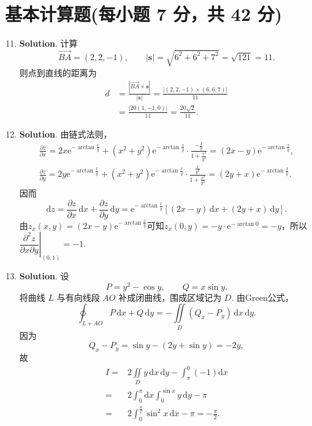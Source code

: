 \documentclass[../main.tex]{subfiles}
\begin{document}
\section{基本计算题(每小题 7 分，共 42 分)}
\begin{enumerate}
    \setcounter{enumi}{10}
    \item \textbf{Solution}. 计算
          \[
              \overrightarrow{BA}=(2,2,-1),\qquad |\boldsymbol{s}|=\sqrt{6^2+6^2+7^2}=\sqrt{121}=11.
          \]
          则点到直线的距离为
          \[
              \begin{aligned}
                  d & =\frac{|\overrightarrow{BA}\times \boldsymbol{s}|}{|\boldsymbol{s}|}
                  =\frac{|(2,2,-1)\times (6,6,7)|}{11}                                     \\
                    & =\frac{|20(1,-1,0)|}{11}
                  =\frac{20\sqrt2}{11}.
              \end{aligned}
          \]

    \item \textbf{Solution}. 由链式法则，
          \[
              \begin{gathered}
                  \frac{\partial z}{\partial x}=2x\mathrm{e}^{-\arctan\frac{x}{y}}+\left(x^2+y^2\right)\mathrm{e}^{-\arctan\frac{x}{y}}\cdot\frac{-\frac{1}{y}}{1+\frac{x^2}{y^2}}=(2x-y)\mathrm{e}^{-\arctan\frac{x}{y}},\\
                  \frac{\partial z}{\partial y}=2y\mathrm{e}^{-\arctan\frac{x}{y}}+\left(x^2+y^2\right)\mathrm{e}^{-\arctan\frac{x}{y}}\cdot\frac{\frac{x}{y^2}}{1+\frac{x^2}{y^2}}=(2y+x)\mathrm{e}^{-\arctan\frac{x}{y}}.
              \end{gathered}
          \]
          因而
          \[
              \mathrm{d}z=\frac{\partial z}{\partial x}\,\mathrm{d}x+\frac{\partial z}{\partial y}\,\mathrm{d}y=\mathrm{e}^{-\arctan\frac{x}{y}}\left[(2x-y)\,\mathrm{d}x+(2y+x)\,\mathrm{d}y\right].
          \]
          由$z_x(x,y)=(2x-y)\mathrm{e}^{-\arctan\frac{x}{y}}$可知$z_x(0,y)=-y\cdot\mathrm{e}^{-\arctan 0}=-y$，所以$\left.\dfrac{\partial^2z}{\partial x\partial y}\right|_{(0,1)}=-1$.


    \item \textbf{Solution}. 设
          \[
              P=y^2-\cos y,\qquad Q=x\sin y.
          \]
          将曲线 \(L\) 与有向线段 \(AO\) 补成闭曲线，围成区域记为 \(D\). 由Green公式，
          \[
              \oint_{L+AO}P\,\mathrm{d}x+Q\,\mathrm{d}y
              =-\iint\limits_D(Q_x-P_y)\,\mathrm{d}x\,\mathrm{d}y.
          \]
          因为
          \[
              Q_x-P_y=\sin y-(2y+\sin y)=-2y,
          \]
          故
          \[
              \begin{aligned}
                  I= {} & 2\iint\limits_D y\,\mathrm{d}x\,\mathrm{d}y - \int_{\pi}^{0} (-1)\mathrm{d}x \\
                  = {}  & 2\int_0^{\pi}\mathrm{d}x\int_0^{\sin x} y\,\mathrm{d}y - \pi                 \\
                  = {}  & 2\int_0^{\frac{\pi}{2}}\sin^2 x\,\mathrm{d}x - \pi=-\frac{\pi}{2}.
              \end{aligned}
          \]


\end{enumerate}
\end{document}
